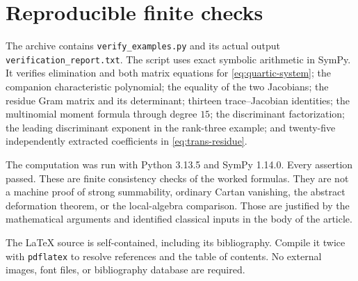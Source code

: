\documentclass[11pt,letterpaper]{article}
\theoremstyle{definition}
\theoremstyle{remark}
\numberwithin{equation}{section}
\begin{document}
\section{Reproducible finite checks}\label{app:checks}
The archive contains \texttt{verify\_examples.py} and its actual output \texttt{verification\_report.txt}. The script uses exact symbolic arithmetic in SymPy. It verifies elimination and both matrix equations for \eqref{eq:quartic-system}; the companion characteristic polynomial; the equality of the two Jacobians; the residue Gram matrix and its determinant; thirteen trace--Jacobian identities; the multinomial moment formula through degree $15$; the discriminant factorization; the leading discriminant exponent in the rank-three example; and twenty-five independently extracted coefficients in \eqref{eq:trans-residue}.

The computation was run with Python 3.13.5 and SymPy 1.14.0. Every assertion passed. These are finite consistency checks of the worked formulas. They are not a machine proof of strong summability, ordinary Cartan vanishing, the abstract deformation theorem, or the local-algebra comparison. Those are justified by the mathematical arguments and identified classical inputs in the body of the article.

The \LaTeX{} source is self-contained, including its bibliography. Compile it twice with \texttt{pdflatex} to resolve references and the table of contents. No external images, font files, or bibliography database are required.
\end{document}
